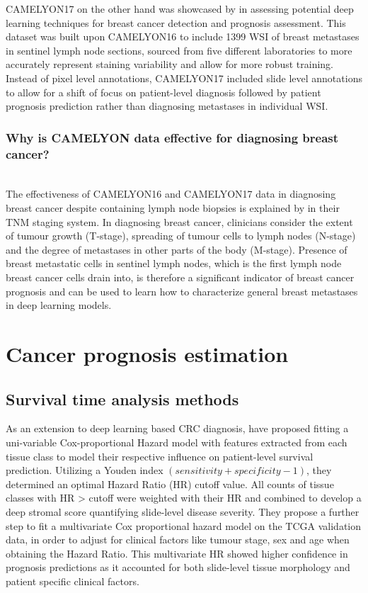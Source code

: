 \documentclass{l4proj}
\begin{document}
CAMELYON17 on the other hand was showcased by \cite{bandi2018detection} in assessing potential deep learning techniques for breast cancer detection and prognosis assessment. This dataset was built upon CAMELYON16 to include 1399 WSI of breast metastases in sentinel lymph node sections, sourced from five different laboratories to more accurately represent staining variability and allow for more robust training. Instead of pixel level annotations, CAMELYON17 included slide level annotations to allow for a shift of focus on patient-level diagnosis followed by patient prognosis prediction rather than diagnosing metastases in individual WSI. 
\\
\subsubsection{Why is CAMELYON data effective for diagnosing breast cancer?}
\hfill\\
The effectiveness of CAMELYON16 and CAMELYON17 data in diagnosing breast cancer despite containing lymph node biopsies is explained by \cite{sobin2011tnm} in their TNM staging system. In diagnosing breast cancer, clinicians consider the extent of tumour growth (T-stage), spreading of tumour cells to lymph nodes (N-stage) and the degree of metastases in other parts of the body (M-stage). Presence of breast metastatic cells in sentinel lymph nodes, which is the first lymph node breast cancer cells drain into, is therefore a significant indicator of breast cancer prognosis and can be used to learn how to characterize general breast metastases in deep learning models.


\section{Cancer prognosis estimation}
\subsection{Survival time analysis methods} \label{survival-analysis-methods}
As an extension to deep learning based CRC diagnosis, \cite{Kather2019} have proposed fitting a uni-variable Cox-proportional Hazard model with features extracted from each tissue class to model their respective influence on patient-level survival prediction. Utilizing a Youden index \((sensitivity + specificity - 1)\), they determined an optimal Hazard Ratio (HR) cutoff value. All counts of tissue classes with HR > cutoff were weighted with their HR and combined to develop a deep stromal score quantifying slide-level disease severity. They propose a further step to fit a multivariate Cox proportional hazard model on the TCGA validation data, in order to adjust for clinical factors like tumour stage, sex and age when obtaining the Hazard Ratio. This multivariate HR showed higher confidence in prognosis predictions as it accounted for both slide-level tissue morphology and patient specific clinical factors. 
\end{document}
